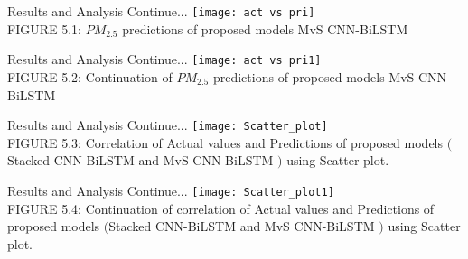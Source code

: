 \documentclass[12pt, aspectratio=169]{beamer}
\begin{document}

\begin{frame}{Results and Analysis \tiny{Continue...}}
	\centering
	\texttt{[image: act vs pri]}\\
	\scriptsize{FIGURE 5.1: $PM_{2.5}$ predictions of proposed models MvS CNN-BiLSTM}
\end{frame}



\begin{frame}{Results and Analysis \tiny{Continue...}}
	\centering
	\texttt{[image: act vs pri1]}\\
	\scriptsize{FIGURE 5.2: Continuation of $PM_{2.5}$ predictions of proposed models MvS CNN-BiLSTM}
\end{frame}


\begin{frame}{Results and Analysis \tiny{Continue...}}
	\centering
	\texttt{[image: Scatter\_plot]}\\
	\scriptsize{FIGURE 5.3: Correlation of Actual values and Predictions of proposed models $($Stacked CNN-BiLSTM and MvS CNN-BiLSTM $)$ using Scatter plot.}
\end{frame}
\begin{frame}{Results and Analysis \tiny{Continue...}}
	\centering
	\texttt{[image: Scatter\_plot1]}\\
	\scriptsize{FIGURE 5.4: Continuation of correlation of Actual values and Predictions of proposed models $($Stacked CNN-BiLSTM and MvS CNN-BiLSTM $)$ using Scatter plot.}
\end{frame}
\end{document}
